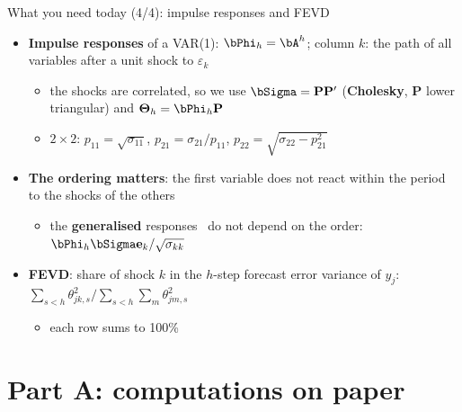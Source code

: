 \begin{frame}{What you need today (4/4): impulse responses and FEVD}
\itemsize{\small}
\begin{itemize}
    \item \textbf{Impulse responses} of a VAR(1): $\bPhi_h = \bA^h$; column $k$: the path of all variables after a unit shock to $\varepsilon_k$
    \begin{itemize}
        \item the shocks are correlated, so we use $\bSigma = \mathbf{P}\mathbf{P}'$ (\textbf{Cholesky}, $\mathbf{P}$ lower triangular) and $\boldsymbol{\Theta}_h = \bPhi_h\mathbf{P}$
        \item $2 \times 2$: $p_{11} = \sqrt{\sigma_{11}}$, $p_{21} = \sigma_{21}/p_{11}$, $p_{22} = \sqrt{\sigma_{22} - p_{21}^2}$
    \end{itemize}
    \item \textbf{The ordering matters}: the first variable does not react within the period to the shocks of the others
    \begin{itemize}
        \item the \textbf{generalised} responses \ do not depend on the order: $\bPhi_h\bSigma\mathbf{e}_k/\sqrt{\sigma_{kk}}$
    \end{itemize}
    \item \textbf{FEVD}: share of shock $k$ in the $h$-step forecast error variance of $y_j$: $\sum_{s<h}\theta_{jk,s}^2 / \sum_{s<h}\sum_m\theta_{jm,s}^2$
    \begin{itemize}
        \item each row sums to 100\%
    \end{itemize}
\end{itemize}
\end{frame}


\section{Part A: computations on paper}

